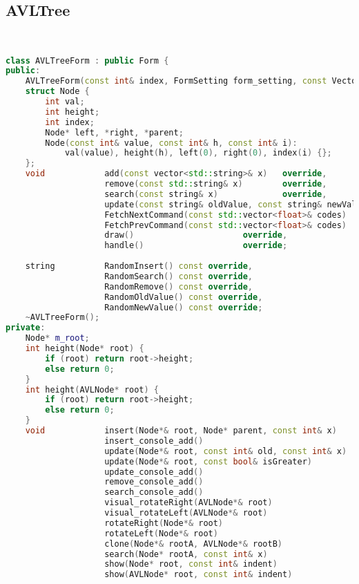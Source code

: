 \subsection{AVLTree}
\begin{lstlisting}[language=C++]


class AVLTreeForm : public Form {
public:
    AVLTreeForm(const int& index, FormSetting form_setting, const Vector2& window_size);
    struct Node {
        int val;
        int height;
        int index;
        Node* left, *right, *parent;
        Node(const int& value, const int& h, const int& i): 
            val(value), height(h), left(0), right(0), index(i) {};
    };
    void            add(const vector<std::string>& x)   override,
                    remove(const std::string& x)        override,
                    search(const string& x)             override,
                    update(const string& oldValue, const string& newValue)  override,
                    FetchNextCommand(const std::vector<float>& codes)       override,
                    FetchPrevCommand(const std::vector<float>& codes)       override,
                    draw()                      override,
                    handle()                    override;
    
    string          RandomInsert() const override,
                    RandomSearch() const override,
                    RandomRemove() const override,
                    RandomOldValue() const override,
                    RandomNewValue() const override;
    ~AVLTreeForm();
private:
    Node* m_root;
    int height(Node* root) {
        if (root) return root->height;
        else return 0;
    }
    int height(AVLNode* root) {
        if (root) return root->height;
        else return 0;
    }
    void            insert(Node*& root, Node* parent, const int& x)                 ,
                    insert_console_add()                                            ,
                    update(Node*& root, const int& old, const int& x)               ,
                    update(Node*& root, const bool& isGreater)                      ,
                    update_console_add()                                            ,
                    remove_console_add()                                            ,
                    search_console_add()                                            ,
                    visual_rotateRight(AVLNode*& root)                              ,
                    visual_rotateLeft(AVLNode*& root)                               ,
                    rotateRight(Node*& root)                                        ,
                    rotateLeft(Node*& root)                                         ,
                    clone(Node*& rootA, AVLNode*& rootB)                            ,
                    search(Node* rootA, const int& x)                               ,
                    show(Node* root, const int& indent)                             ,
                    show(AVLNode* root, const int& indent)                          ;
    

\end{lstlisting}
